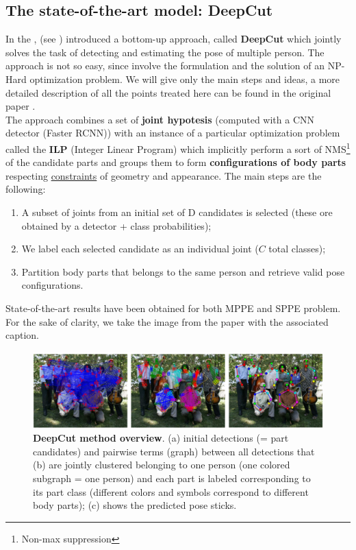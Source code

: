 \subsection{The state-of-the-art model: DeepCut}
In the , \citeauthor{DeepCut} (see \cite{DeepCut}) introduced a bottom-up approach, called \textbf{DeepCut} which jointly solves the task of detecting and estimating the pose of multiple person. The approach is not so easy, since involve the formulation and the solution of an NP-Hard optimization problem. We will give only the main steps and ideas, a more detailed description of all the points treated here can be found in the original paper \cite{DeepCut}.\\
 The approach combines a set of \textbf{joint hypotesis} (computed with a CNN detector (Faster RCNN)) with an instance of a particular  optimization problem called the \textbf{ILP} (Integer Linear Program) which implicitly perform a sort of NMS\footnote{Non-max suppression} of the candidate parts and groups them to form \textbf{configurations of body parts} respecting \underline{constraints} of geometry and appearance. The main steps are the following: 
\begin{enumerate}
    \itemsep-0.3em
    \item A subset of joints from an initial set of D candidates is selected (these ore obtained by a detector + class probabilities); 
    \item We label each selected candidate as an individual joint ($C$ total classes); 
    \item Partition body parts that belongs to the same person and retrieve valid pose configurations.
\end{enumerate}
State-of-the-art results have been obtained for both MPPE and SPPE problem. For the sake of clarity, we take the image from the paper \cite{DeepCut} with the associated caption. 

\begin{figure}[h]
    \centering
    \includegraphics[scale=0.6]{img/DeepCut1.png}
    \caption{\textbf{DeepCut method overview}. (a) initial detections (= part candidates) and pairwise terms (graph) between all detections that (b) are jointly clustered belonging to one person (one colored subgraph = one person) and each part is labeled corresponding to its part class (different colors and symbols correspond to different body parts); (c) shows the predicted pose sticks.}
\end{figure}

